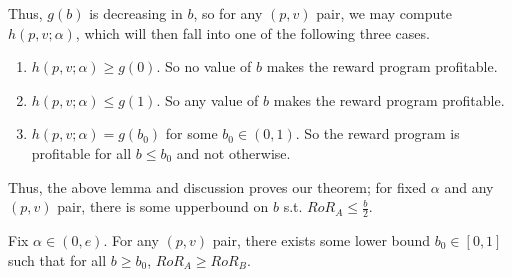 Thus, $g(b)$ is decreasing in $b$, so for any $(p,v)$ pair, we may compute $h(p, v; \alpha)$, which will then fall into one of the following three cases.
\begin{enumerate}
\item
$h(p,v;\alpha) \geq g(0)$. So no value of $b$ makes the reward program profitable.
\item
$h(p,v;\alpha) \leq g(1)$. So any value of $b$ makes the reward program profitable.
\item
$h(p,v;\alpha) = g(b_0)$ for some $b_0 \in (0,1)$. So the reward program is profitable for all $b \leq b_0$ and not otherwise.
\end{enumerate}

Thus, the above lemma and discussion proves our theorem; for fixed $\alpha$ and any $(p,v)$ pair, there is some upperbound on $b$ s.t. $RoR_A \leq \frac{b}{2}$. 

\begin{lemma}
Fix $\alpha \in (0, e)$. For any $(p,v)$ pair, there exists some lower bound $b_0 \in [0,1]$ such that for all $b \geq b_0$, $RoR_A \geq RoR_B$.
\end{lemma}

